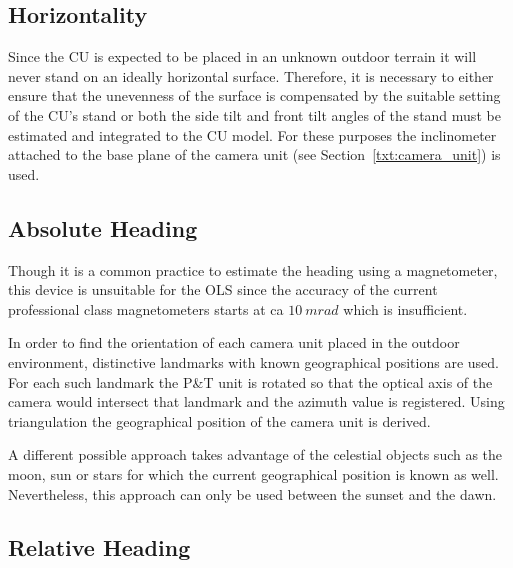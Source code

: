 \subsection{Horizontality}
Since the CU is expected to be placed in an unknown outdoor terrain it will never stand on an ideally horizontal surface. Therefore, it is necessary to either ensure that the unevenness of the surface is compensated by the suitable setting of the CU's stand or both the side tilt and front tilt angles of the stand must be estimated and integrated to the CU model. For these purposes the inclinometer attached to the base plane of the camera unit (see Section~\ref{txt:camera_unit}) is used.

\subsection{Absolute Heading} \label{txt:absolute_heading}

Though it is a common practice to estimate the heading using a magnetometer, this device is unsuitable for the OLS since the accuracy of the current professional class magnetometers starts at ca $10~mrad$ \cite{Honeywell:compassing_catalog} which is insufficient.

In order to find the orientation of each camera unit placed in the outdoor environment, distinctive landmarks with known geographical positions are used. For each such landmark the P\&T unit is rotated so that the optical axis of the camera would intersect that landmark and the azimuth value is registered. Using triangulation the geographical position of the camera unit is derived.

A different possible approach takes advantage of the celestial objects such as the moon, sun or stars for which the current geographical position is known as well. Nevertheless, this approach can only be used between the sunset and the dawn.

\subsection{Relative Heading}

